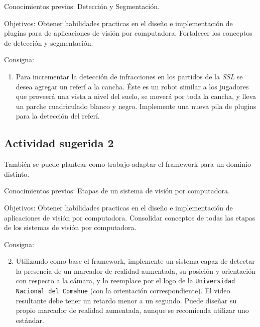 \begin{description}

	\item{Conocimientos previos}: Detección y Segmentación.

	\item{Objetivos}: Obtener habilidades practicas en el diseño e
		implementación de plugins para de aplicaciones de visión por
		computadora. Fortalecer los conceptos de detección y
		segmentación.

	\item{Consigna}: \begin{enumerate}

	\item{Para incrementar la detección de infracciones en los partidos de
		la \emph{SSL} se desea agregar un referí a la cancha. Éste es un
		robot similar a los jugadores que proveerá una vista a nivel del
		suelo, se moverá por toda la cancha, y lleva un parche
		cuadriculado blanco y negro. Implemente una nueva pila de
		plugins para la detección del referí.}

\end{enumerate}

\end{description}

\subsection{Actividad sugerida 2}

También se puede plantear como trabajo adaptar el framework para un dominio
distinto.

\begin{description}

	\item{Conocimientos previos}: Etapas de un sistema de visión por
		computadora.

	\item{Objetivos}: Obtener habilidades practicas en el diseño e
		implementación de aplicaciones de visión por computadora.
		Consolidar conceptos de todas las etapas de los sistemas de
		visión por computadora.

	\item{Consigna}: \begin{enumerate}

	\setcounter{enumi}{1}

	\item{Utilizando como base el framework, implemente un sistema capaz de
		detectar la presencia de un marcador de realidad aumentada, su
		posición y orientación con respecto a la cámara, y lo reemplace
		por el logo de la \texttt{Universidad Nacional del Comahue} (con
		la orientación correspondiente). El video resultante debe tener
		un retardo menor a un segundo.  Puede diseñar su propio marcador
		de realidad aumentada, aunque se recomienda utilizar uno
		estándar.}

\end{enumerate}

\end{description}
